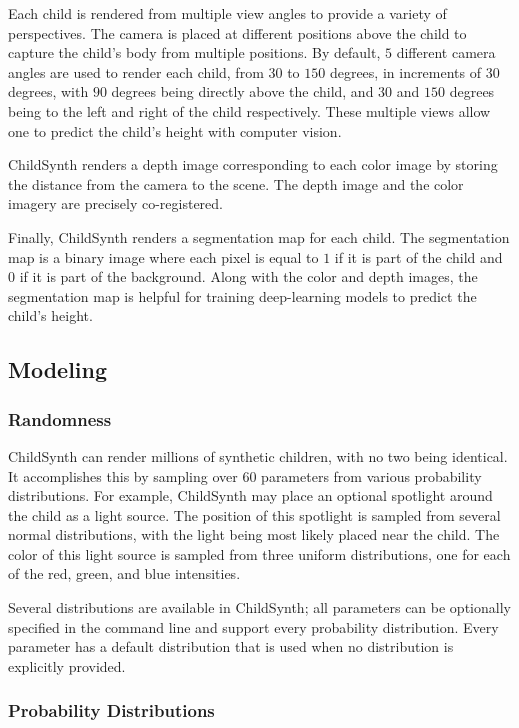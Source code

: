 \documentclass{article}
\begin{document}
Each child is rendered from multiple view angles to provide a variety of perspectives. The camera is placed at different positions above the child to capture the child's body from multiple positions. By default, $5$ different camera angles are used to render each child, from $30$ to $150$ degrees, in increments of $30$ degrees, with $90$ degrees being directly above the child, and $30$ and $150$ degrees being to the left and right of the child respectively. These multiple views allow one to predict the child's height with computer vision.

ChildSynth renders a depth image corresponding to each color image by storing the distance from the camera to the scene. The depth image and the color imagery are precisely co-registered.

Finally, ChildSynth renders a segmentation map for each child. The segmentation map is a binary image where each pixel is equal to $1$ if it is part of the child and $0$ if it is part of the background. Along with the color and depth images, the segmentation map is helpful for training deep-learning models to predict the child's height.


\subsection{Modeling}

\subsubsection{Randomness}

ChildSynth can render millions of synthetic children, with no two being identical.  It accomplishes this by sampling over $60$ parameters from various probability distributions. For example, ChildSynth may place an optional spotlight around the child as a light source. The position of this spotlight is sampled from several normal distributions, with the light being most likely placed near the child. The color of this light source is sampled from three uniform distributions, one for each of the red, green, and blue intensities. 

Several distributions are available in ChildSynth; all parameters can be optionally specified in the command line and support every probability distribution. Every parameter has a default distribution that is used when no distribution is explicitly provided.

\subsubsection{Probability Distributions}
\end{document}
